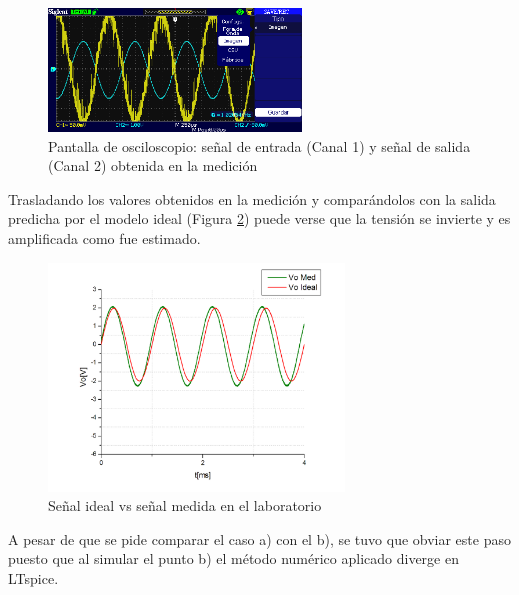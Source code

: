\begin{figure}[H]
  \centering
      \includegraphics[width=0.6\textwidth]{gfxhernan/ampliparta.PNG}
  \caption{Pantalla de osciloscopio: señal de entrada (Canal 1) y señal de salida (Canal 2) obtenida en la medición}
  \label{fig:multipl_a}
\end{figure}

Trasladando los valores obtenidos en la medición y comparándolos con la salida predicha por el modelo ideal (Figura \ref{fig:multipl_a_idealvsmed}) puede verse que la tensión se invierte y es amplificada como fue estimado.

\begin{figure}[h]
  \centering
      \includegraphics[width=0.7\textwidth]{gfxhernan/idealvsmedicionamplia.PNG}
  \caption{Señal ideal vs señal medida en el laboratorio}
  \label{fig:multipl_a_idealvsmed}
\end{figure}


A pesar de que se pide comparar el caso a) con el b), se tuvo que obviar este paso puesto que al simular el punto b) el método numérico aplicado diverge en LTspice.

